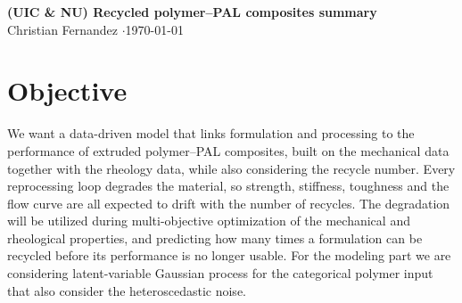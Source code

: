 \documentclass[10pt]{article}
\begin{document}
\begin{center}
  {\Large\bfseries (UIC \& NU) Recycled polymer--PAL composites summary}\\[2pt]
  {\small Christian Fernandez \quad$\cdot$\quad \today}
\end{center}
\vspace{-6pt}

\section{Objective}
We want a data-driven model that links formulation and processing to the performance of extruded polymer--PAL composites, built on the mechanical data together with the rheology data, while also considering the recycle number. Every reprocessing loop degrades the material, so strength, stiffness, toughness and the flow curve are all expected to drift with the number of recycles. The degradation will be utilized during multi-objective optimization of the mechanical and rheological properties, and predicting how many times a formulation can be recycled before its performance is no longer usable. For the modeling part we are considering  latent-variable Gaussian process for the categorical polymer input that also consider the heteroscedastic noise.

\end{document}
